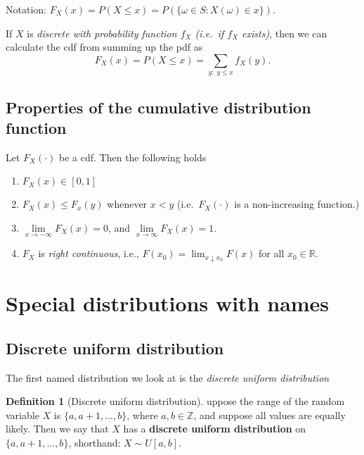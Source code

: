 \documentclass[
]{book}
\theoremstyle{definition}
\newtheorem{definition}{Definition}[chapter]
\theoremstyle{definition}
\theoremstyle{definition}
\theoremstyle{definition}
\theoremstyle{remark}
\begin{document}
Notation: \(F_X(x) = P(X\le x) = P(\{\omega \in S : X(\omega)\in x\}).\)

If \(X\) is \emph{discrete with probability function \(f_X\) (i.e.~if \(f_X\) exists)}, then we can calculate the cdf from summing up the pdf as
\[
F_X(x)=P( X \le x ) = \sum_{y:\; y\le x}f_X(y).
\]

\hypertarget{properties-of-the-cumulative-distribution-function}{%
\subsection{Properties of the cumulative distribution function}\label{properties-of-the-cumulative-distribution-function}}

Let \(F_X(\cdot)\) be a cdf. Then the following holds

\begin{enumerate}
\def\labelenumi{\arabic{enumi}.}
\item
  \(F_X(x)\in [0,1]\)
\item
  \(F_X(x) \le F_x(y)\) whenever \(x<y\) (i.e.~\(F_X(\cdot)\) is a non-increasing function.)
\item
  \(\lim\limits_{x \to - \infty } F_X(x)=0\), and \(\lim\limits_{x \to \infty } F_X(x) = 1\).
\item
  \(F_X\) is \emph{right continuous}, i.e., \(F(x_0)=\lim_{x\downarrow x_0} F(x)\) for all \(x_0\in\mathbb{R}\).
\end{enumerate}

\hypertarget{special-distributions-with-names}{%
\section{Special distributions with names}\label{special-distributions-with-names}}

\hypertarget{discrete-uniform-distribution}{%
\subsection{Discrete uniform distribution}\label{discrete-uniform-distribution}}

The first named distribution we look at is the \emph{discrete uniform distribution}

\begin{definition}[Discrete uniform distribution]
uppose the range of the random variable \(X\) is \(\{a,a+1,\dots, b\}\), where \(a,b\in\mathbb{Z}\), and suppose all values are equally likely. Then we say that \(X\) has a \textbf{discrete uniform distribution} on \(\{a,a+1,\dots,b\}\), shorthand: \(X \sim U[a,b]\).
\end{definition}
\end{document}
